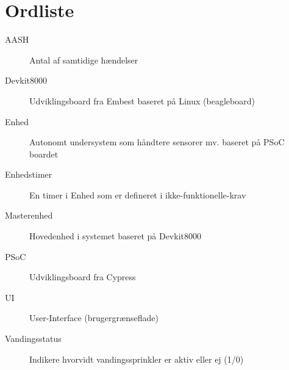 \chapter{Ordliste}


\begin{description}

\item[AASH] Antal af samtidige hændelser
\item[Devkit8000] Udviklingsboard fra Embest baseret på Linux (beagleboard)
\item[Enhed] Autonomt undersystem som håndtere sensorer mv. baseret på PSoC boardet
\item[Enhedstimer] En timer i Enhed som er defineret i ikke-funktionelle-krav
\item[Masterenhed] Hovedenhed i systemet baseret på Devkit8000
\item[PSoC] Udviklingsboard fra Cypress
\item[UI] User-Interface (brugergrænseflade)
\item[Vandingsstatus] Indikere hvorvidt vandingssprinkler er aktiv eller ej (1/0)

\end{description}
